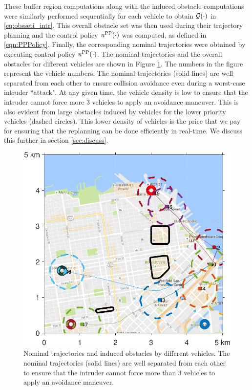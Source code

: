 These buffer region computations along with the induced obstacle computations were similarly performed sequentially for each vehicle to obtain $\mathcal{G}(\cdot)$ in \eqref{eq:obsseti_intr}. This overall obstacle set was then used during their trajectory planning and the control policy $u^{\text{PP}}(\cdot)$ was computed, as defined in \eqref{eqn:PPPolicy}. Finally, the corresponding nominal trajectories were obtained by executing control policy $u^{\text{PP}}(\cdot)$. %
The nominal trajectories and the overall obstacles for different vehicles are shown in Figure \ref{fig:trajObsSim}. The numbers in the figure represent the vehicle numbers. The nominal trajectories (solid lines) are well separated from each other to ensure collision avoidance even during a worst-case intruder ``attack". At any given time, the vehicle density is low to ensure that the intruder cannot force more 3 vehicles to apply an avoidance maneuver. This is also evident from large obstacles induced by vehicles for the lower priority vehicles (dashed circles). This lower density of vehicles is the price that we pay for ensuring that the replanning can be done efficiently in real-time. We discuss this further in section \ref{sec:discuss}.
\begin{figure}
  \centering
  \includegraphics[width=0.8\columnwidth]{"figs/nomTraj"}
  \caption{Nominal trajectories and induced obstacles by different vehicles. The nominal trajectories (solid lines) are well separated from each other to ensure that the intruder cannot force more than 3 vehicles to apply an avoidance maneuver.}
  \label{fig:trajObsSim}
\end{figure}

